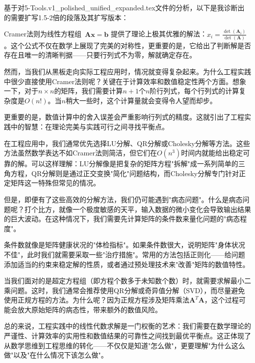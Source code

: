 基于对5-Tools.v1_polished_unified_expanded.tex文件的分析，以下是我诊断出的需要扩写1.5-2倍的段落及其扩写版本：


Cramer法则为线性方程组~$\mathbf{A}\mathbf{x} = \mathbf{b}$ 提供了理论上极其优雅的解法：$x_i = \frac{\det(\mathbf{A}_i)}{\det(\mathbf{A})}$。这个公式不仅在数学上展现了完美的对称性，更重要的是，它给出了判断解是否存在且唯一的清晰判据——只要行列式不为零，解就确定存在。

然而，当我们从黑板走向实际工程应用时，情况就变得复杂起来。为什么工程实践中很少直接使用Cramer法则呢？关键在于计算效率和数值稳定性两个方面。想象一下，对于$n \times n$的矩阵，我们需要计算$n+1$个$n$阶行列式，每个行列式的计算复杂度是$O(n!)$。当$n$稍大一些时，这个计算量就会变得令人望而却步。

更重要的是，数值计算中的舍入误差会严重影响行列式的精度。这就引出了工程实践中的智慧：在理论完美与实践可行之间寻找平衡点。

在工程应用中，我们通常优先选择LU分解、QR分解或Cholesky分解等方法。这些方法虽然数学表达不如Cramer法则简洁，但它们在$O(n^3)$时间内就能给出稳定可靠的解。可以这样理解：LU分解像是把复杂的矩阵方程"拆解"成一系列简单的三角方程，QR分解则是通过正交变换"简化"问题结构，而Cholesky分解专门针对正定矩阵这一特殊但常见的情况。

但是，即便有了这些高效的分解方法，我们仍可能遇到"病态问题"。什么是病态问题呢？打个比方，就像一个极度敏感的天平，输入数据的微小变化会导致输出结果的巨大波动。在这种情况下，我们需要先计算矩阵的条件数来量化问题的"病态程度"。

条件数就像是矩阵健康状况的"体检指标"。如果条件数很大，说明矩阵"身体状况不佳"，此时我们就需要采取一些"治疗措施"。常用的方法包括正则化——给问题添加适当的约束来稳定解的性质，或者通过预处理技术来"改善"矩阵的数值特性。

当我们面对的是超定方程组（即方程个数多于未知数个数）时，就需要求解最小二乘问题。这时，我们通常会推荐使用QR分解或奇异值分解（SVD），而尽量避免使用正规方程的方法。为什么呢？因为正规方程涉及矩阵乘法$\mathbf{A}^T\mathbf{A}$，这个过程可能会放大原始矩阵的病态性，带来额外的数值风险。

总的来说，工程实践中的线性代数求解是一门权衡的艺术：我们需要在数学理论的严谨性、计算效率的实用性和数值结果的可靠性之间找到最优平衡点。这正体现了从数学思维到工程思维的转化——不仅仅是知道"怎么做"，更要理解"为什么这么做"以及"在什么情况下该怎么做"。


